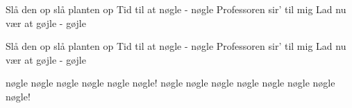 \documentclass[a4paper,11pt]{article}
\begin{document}
\begin{song}
Slå den op slå planten op
Tid til at nøgle - nøgle 
Professoren sir’ til mig
Lad nu vær at gøjle - gøjle 


Slå den op slå planten op
Tid til at nøgle - nøgle 
Professoren sir’ til mig
Lad nu vær at gøjle - gøjle 


nøgle nøgle
nøgle nøgle
nøgle nøgle!
nøgle nøgle
nøgle nøgle
nøgle nøgle
nøgle nøgle!

\end{song}
\end{document}
